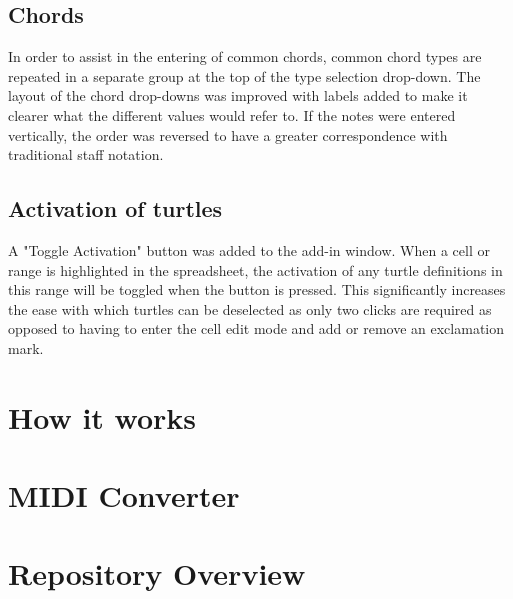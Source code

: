 \subsection{Chords}

In order to assist in the entering of common chords, common chord types are repeated in a separate group  at the top of the type selection drop-down. The layout of the chord drop-downs was improved with labels added to make it clearer what the different values would refer to. If the notes were entered vertically, the order was reversed to have a greater correspondence with traditional staff notation.

\subsection{Activation of turtles}

A "Toggle Activation" button was added to the add-in window. When a cell or range is highlighted in the spreadsheet, the activation of any turtle definitions in this range will be toggled when the button is pressed.  This significantly increases the ease with which turtles can be deselected as only two clicks are required as opposed to having to enter the cell edit mode and add or remove an exclamation mark.

\section{How it works}

\section{MIDI Converter}

\section{Repository Overview}

